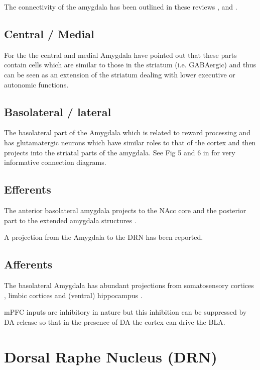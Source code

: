 \documentclass[12pt,a4paper]{article}
\let\oldsection\section
\renewcommand\section{\clearpage\oldsection}
\begin{document}
The connectivity of the amygdala has been outlined in these reviews \citep{Alheid2003}, \citep{Sah2003} and \citep{Swanson1998}.

\subsection{Central / Medial}

For the  the central and medial Amygdala \citep{Swanson2003}\citep{Swanson1998} have pointed out that these parts contain cells which are similar to those in the striatum (i.e. GABAergic) and thus can be seen as an extension of the striatum dealing with lower executive or autonomic functions.

\subsection{Basolateral / lateral}

The basolateral part of the Amygdala which is related to reward processing and has glutamatergic neurons which have similar roles to that of the cortex and then projects into the striatal parts of the amygdala. See Fig 5 and 6 in \citep{Swanson1998} for very informative connection diagrams.

\subsection{Efferents}

The anterior basolateral amygdala projects to the NAcc core and the  posterior part to the extended amygdala structures  \citep{Alheid2003}.

A projection from the Amygdala to the DRN \citep{PollakDorocic2014} has been reported.

\subsection{Afferents}

The basolateral Amygdala has abundant projections from somatosensory cortices 
\citep{Swanson1998}, limbic cortices \citep{Ottersen1982} and (ventral) hippocampus \citep{Pitkanen2000}.

mPFC inputs are inhibitory in nature \citep{Rosenkranz2002} but this inhibition can be suppressed by DA release so that in the presence of DA the cortex can drive the BLA.




\section{Dorsal Raphe Nucleus (DRN)}
\end{document}
